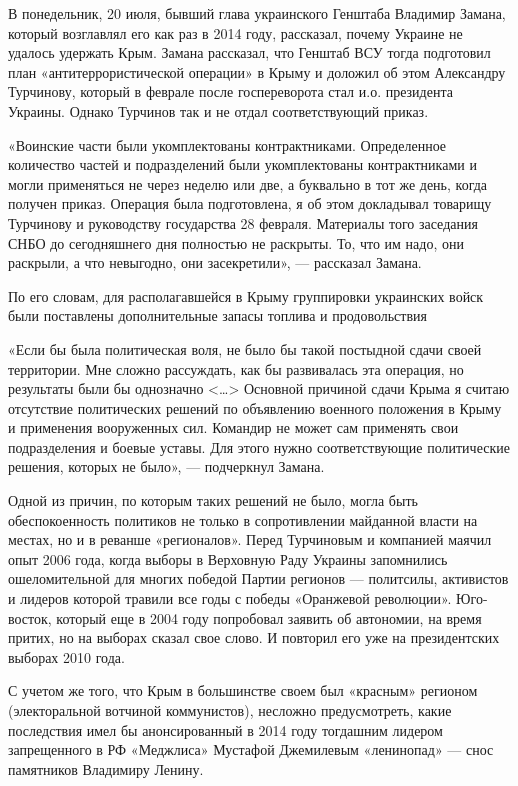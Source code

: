 В понедельник, 20 июля, бывший глава украинского Генштаба Владимир Замана, который возглавлял его как раз в 2014 году, рассказал, почему Украине не удалось удержать Крым. Замана рассказал, что Генштаб ВСУ тогда подготовил план «антитеррористической операции» в Крыму и доложил об этом Александру Турчинову, который в феврале после госпереворота стал и.о. президента Украины. Однако Турчинов так и не отдал соответствующий приказ.

«Воинские части были укомплектованы контрактниками. Определенное количество частей и подразделений были укомплектованы контрактниками и могли применяться не через неделю или две, а буквально в тот же день, когда получен приказ. Операция была подготовлена, я об этом докладывал товарищу Турчинову и руководству государства 28 февраля. Материалы того заседания СНБО до сегодняшнего дня полностью не раскрыты. То, что им надо, они раскрыли, а что невыгодно, они засекретили», --- рассказал Замана.

По его словам, для располагавшейся в Крыму группировки украинских войск были поставлены дополнительные запасы топлива и продовольствия

«Если бы была политическая воля, не было бы такой постыдной сдачи своей территории. Мне сложно рассуждать, как бы развивалась эта операция, но результаты были бы однозначно <…> Основной причиной сдачи Крыма я считаю отсутствие политических решений по объявлению военного положения в Крыму и применения вооруженных сил. Командир не может сам применять свои подразделения и боевые уставы. Для этого нужно соответствующие политические решения, которых не было», --- подчеркнул Замана.

Одной из причин, по которым таких решений не было, могла быть обеспокоенность политиков не только в сопротивлении майданной власти на местах, но и в реванше «регионалов». Перед Турчиновым и компанией маячил опыт 2006 года, когда выборы в Верховную Раду Украины запомнились ошеломительной для многих победой Партии регионов --- политсилы, активистов и лидеров которой травили все годы с победы «Оранжевой революции». Юго-восток, который еще в 2004 году попробовал заявить об автономии, на время притих, но на выборах сказал свое слово. И повторил его уже на президентских выборах 2010 года.

С учетом же того, что Крым в большинстве своем был «красным» регионом (электоральной вотчиной коммунистов), несложно предусмотреть, какие последствия имел бы анонсированный в 2014 году тогдашним лидером запрещенного в РФ «Меджлиса» Мустафой Джемилевым «ленинопад» --- снос памятников Владимиру Ленину.

